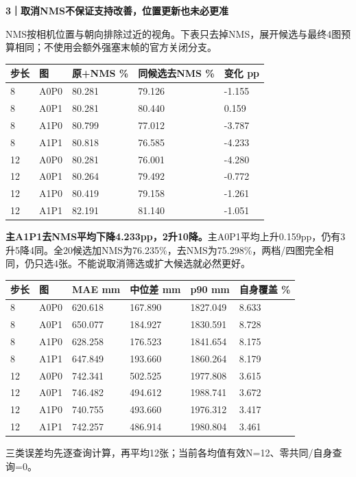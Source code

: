 \documentclass[11pt,a4paper,fontset=none]{ctexart}
\newcommand{\subhead}[1]{\par\vspace{3pt}{\large\bfseries\color{hypothesis1}#1}\par}
\begin{document}
\newpage
{\LARGE\bfseries\color{hypothesis1}3｜取消NMS不保证支持改善，位置更新也未必更准}\par
NMS按相机位置与朝向排除过近的视角。下表只去掉NMS，展开候选与最终4图预算相同；不使用会额外强塞末帧的官方关闭分支。
\par\noindent\begin{tabularx}{\linewidth}{@{}llXXX@{}}\toprule
步长 & 图 & 原+NMS \% & 同候选去NMS \% & 变化 pp \\\midrule
8 & A0P0 & 80.281 & 79.126 & -1.155 \\
8 & A0P1 & 80.281 & 80.440 & 0.159 \\
8 & A1P0 & 80.799 & 77.012 & -3.787 \\
8 & A1P1 & 80.818 & 76.585 & -4.233 \\
12 & A0P0 & 80.281 & 76.001 & -4.280 \\
12 & A0P1 & 80.264 & 79.492 & -0.772 \\
12 & A1P0 & 80.419 & 79.158 & -1.261 \\
12 & A1P1 & 82.191 & 81.140 & -1.051 \\\bottomrule\end{tabularx}\par
\textbf{主A1P1去NMS平均下降4.233pp，2升10降。}主A0P1平均上升0.159pp，仍有3升5降4同。全20候选加NMS为76.235\%，去NMS为75.298\%，两档/四图完全相同，仍只选4张。不能说取消筛选或扩大候选就必然更好。
\subhead{四图共同区域误差与各图自身覆盖}
\par\noindent\begin{tabularx}{\linewidth}{@{}llXXXX@{}}\toprule
步长 & 图 & MAE mm & 中位差 mm & p90 mm & 自身覆盖 \% \\\midrule
8 & A0P0 & 620.618 & 167.890 & 1827.049 & 8.633 \\
8 & A0P1 & 650.077 & 184.927 & 1830.591 & 8.728 \\
8 & A1P0 & 628.258 & 176.523 & 1841.654 & 8.175 \\
8 & A1P1 & 647.849 & 193.660 & 1860.264 & 8.179 \\
12 & A0P0 & 742.341 & 502.525 & 1977.808 & 3.615 \\
12 & A0P1 & 746.482 & 494.612 & 1988.741 & 3.672 \\
12 & A1P0 & 740.755 & 493.660 & 1976.312 & 3.417 \\
12 & A1P1 & 742.257 & 486.914 & 1980.804 & 3.461 \\\bottomrule\end{tabularx}\par
{\small 三类误差均先逐查询计算，再平均12张；当前各均值有效N=12、零共同/自身查询=0。}
\end{document}
